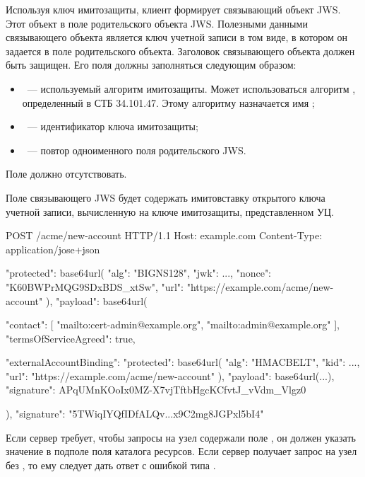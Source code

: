 Используя ключ имитозащиты, клиент формирует связывающий объект JWS.
Этот объект  в поле 
 родительского объекта JWS. Полезными данными 
связывающего объекта является ключ учетной записи в том виде, в котором он 
задается в поле  родительского объекта.
%
Заголовок связывающего объекта должен быть защищен. Его поля должны заполняться
следующим образом:
\begin{itemize}
\item
{}~--- используемый алгоритм имитозащиты.
Может использоваться алгоритм ,
определенный в СТБ 34.101.47. Этому алгоритму назначается 
имя ;
\item
{}~--- идентификатор ключа имитозащиты;
\item
{}~--- повтор одноименного поля родительского JWS.
\end{itemize}
Поле  должно отсутствовать.

Поле  связывающего JWS будет содержать имитовставку открытого
ключа учетной записи, вычисленную на ключе имитозащиты, представленном УЦ.

\begin{codeblock}
POST /acme/new-account HTTP/1.1
Host: example.com
Content-Type: application/jose+json

{
  "protected": base64url({
    "alg": "BIGNS128",
    "jwk": {...},
    "nonce": "K60BWPrMQG9SDxBDS_xtSw",
    "url": "https://example.com/acme/new-account"
  }),
  "payload": base64url({
    "contact": [
      "mailto:cert-admin@example.org",
      "mailto:admin@example.org"
    ],
    "termsOfServiceAgreed": true,

    "externalAccountBinding": {
      "protected": base64url({
        "alg": "HMACBELT",
        "kid": ...,
        "url": "https://example.com/acme/new-account"
      }),
      "payload": base64url({...}),
      "signature": APqUMnKOoIx0MZ-X7vjTftbHgcKCfvtJ_vVdm_Vlgz0
    }
  }),
  "signature": "5TWiqIYQfIDfALQv...x9C2mg8JGPxl5bI4"
}
\end{codeblock}
\fi

Если сервер требует, чтобы запросы на узел  содержали поле
, он должен указать значение 
в подполе  поля  каталога
ресурсов. Если сервер получает запрос на узел  без
, то ему следует дать ответ с ошибкой типа
.

